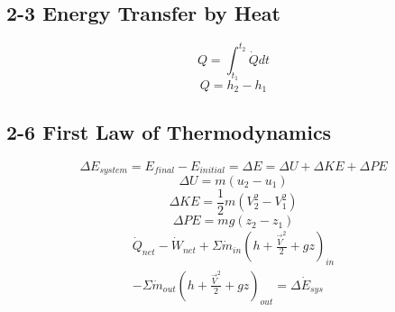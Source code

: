 \documentclass[10pt,landscape]{article}
\begin{document}
\begin{multicols}{3}
\subsection{2-3 Energy Transfer by Heat}
\begin{equation}
    Q=\int^{t_2}_{t_1}\dot{Q}dt
\end{equation}
\begin{equation}
    Q=h_2-h_1
\end{equation}
\subsection{2-6 First Law of Thermodynamics}
\begin{equation}
    \Delta E_{system}=E_{final}-E_{initial}=\Delta E=\Delta U + \Delta KE + \Delta PE
\end{equation}
\begin{equation}
    \Delta U = m(u_2-u_1)
\end{equation}
\begin{equation}
    \Delta KE=\frac{1}{2}m(V_2^2-V_1^2)
\end{equation}
\begin{equation}
    \Delta PE=mg(z_2-z_1)
\end{equation}
\begin{equation}
    \begin{aligned}
        \dot{Q}_{net}-\dot{W}_{net}+\Sigma\dot{m}_{in}(h+\frac{\vec{V}^2}{2}+gz)_{in}\\
        -\Sigma\dot{m}_{out}(h+\frac{\vec{V}^2}{2}+gz)_{out}=\Delta\dot{E}_{sys}
    \end{aligned}
\end{equation}


\end{multicols}
\end{document}
